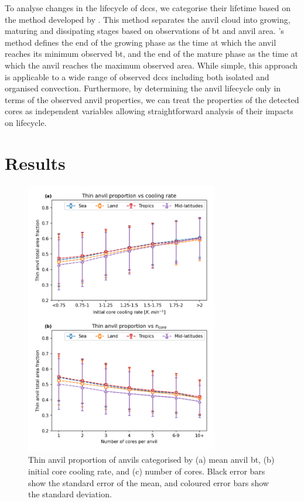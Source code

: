 To analyse changes in the lifecycle of \acrshort{dcc}s, we categorise their lifetime based on the method developed by \citet{futyan_deep_2007}.
This method separates the anvil cloud into growing, maturing and dissipating stages based on observations of \acrshort{bt} and anvil area.
\citeauthor{futyan_deep_2007}'s method defines the end of the growing phase as the time at which the anvil reaches its minimum observed \acrshort{bt}, and the end of the mature phase as the time at which the anvil reaches the maximum observed area.
While simple, this approach is applicable to a wide range of observed \acrshort{dcc}s including both isolated and organised convection.
Furthermore, by determining the anvil lifecycle only in terms of the observed anvil properties, we can treat the properties of the detected cores as independent variables allowing straightforward analysis of their impacts on lifecycle.



\section{Results}

\begin{figure}[tp]
    \centering
    \includegraphics[width=0.75\textwidth]{figures/chapter3_03.png}
    \caption[
    Thin anvil proportion of anvils categorised by mean anvil \acrshort{bt}, initial core cooling rate and number of cores
    ]{
    Thin anvil proportion of anvils categorised by (a) mean anvil \acrshort{bt}, (b) initial core cooling rate, and (c) number of cores. Black error bars show the standard error of the mean, and coloured error bars show the standard deviation.
    }
    \label{fig:thin_anvil_proportion}
\end{figure}

